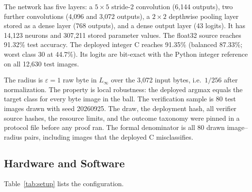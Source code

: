 The network has five layers: a $5\times5$ stride-2 convolution (6,144 outputs), two further convolutions (4,096 and 3,072 outputs), a $2\times2$ depthwise pooling layer stored as a dense layer (768 outputs), and a dense output layer (43 logits). It has 14,123 neurons and 307,211 stored parameter values. The float32 source reaches 91.32\% test accuracy. The deployed integer C reaches 91.35\% (balanced 87.33\%; worst class 30 at 44.7\%). Its logits are bit-exact with the Python integer reference on all 12,630 test images.

The radius is $\varepsilon = 1$ raw byte in $L_\infty$ over the 3,072 input bytes, i.e.\ $1/256$ after normalization. The property is local robustness: the deployed argmax equals the target class for every byte image in the ball. The verification sample is 80 test images drawn with seed 20260925. The draw, the deployment hash, all verifier source hashes, the resource limits, and the outcome taxonomy were pinned in a protocol file before any proof ran. The formal denominator is all 80 drawn image--radius pairs, including images that the deployed C misclassifies.

\subsection{Hardware and Software}
Table~\ref{tab:setup} lists the configuration.

